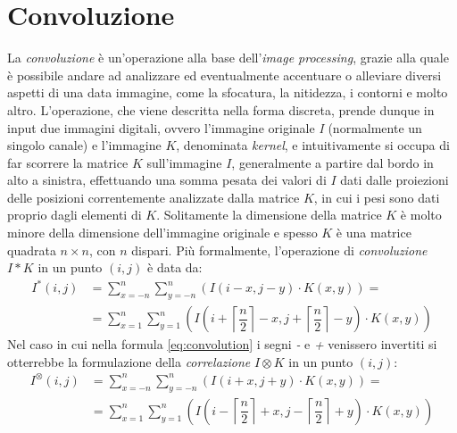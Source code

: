 \section{Convoluzione}
La \textit{convoluzione} \`e un'operazione alla base dell'\textit{image processing}, grazie alla quale \`e possibile andare ad analizzare ed eventualmente accentuare o alleviare diversi aspetti di una data immagine, come la sfocatura, la nitidezza, i contorni e molto altro. L'operazione, che viene descritta nella forma discreta, prende dunque in input due immagini digitali, ovvero l'immagine originale \textit{I} (normalmente un singolo canale) e l'immagine $K$, denominata \textit{kernel}, e intuitivamente si occupa di far scorrere la matrice $K$ sull'immagine $I$, generalmente a partire dal bordo in alto a sinistra, effettuando una somma pesata dei valori di $I$ dati dalle proiezioni delle posizioni correntemente analizzate dalla matrice $K$, in cui i pesi sono dati proprio dagli elementi di $K$. Solitamente la dimensione della matrice $K$ \`e molto minore della dimensione dell'immagine originale e spesso $K$ \`e una matrice quadrata $n\times n$, con $n$ dispari. Pi\`u formalmente, l'operazione di \textit{convoluzione} $I * K$ in un punto $(i,j)$ \`e data da:
\begin{equation}
	\label{eq:convolution}
	\begin{split}
		I^{*}(i, j) & = \sum_{x = -n}^{n}\sum_{y = -n}^{n}(I(i-x, j-y)\cdot K(x,y))=\\
		& = \sum_{x = 1}^{n}\sum_{y = 1}^{n}(I(i + \left\lceil{\dfrac{n}{2}}\right\rceil - x, j + \left\lceil{\dfrac{n}{2}}\right\rceil - y)\cdot K(x,y))
	\end{split}
\end{equation}
Nel caso in cui nella formula \ref{eq:convolution} i segni \textit{-} e \textit{+} venissero invertiti si otterrebbe la formulazione della \textit{correlazione} $I \otimes K$ in un punto $(i,j)$:
\begin{equation}
	\label{eq:correlation}
	\begin{split}
		I^{\otimes}(i, j) & = \sum_{x = -n}^{n}\sum_{y = -n}^{n}(I(i+x, j+y)\cdot K(x,y))=\\
		& = \sum_{x = 1}^{n}\sum_{y = 1}^{n}(I(i - \left\lceil{\dfrac{n}{2}}\right\rceil + x, j - \left\lceil{\dfrac{n}{2}}\right\rceil + y)\cdot K(x,y))
	\end{split}
\end{equation}
